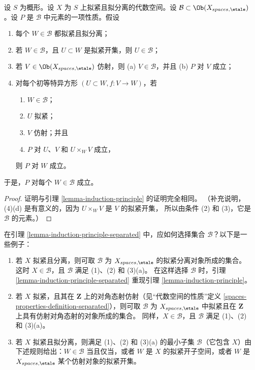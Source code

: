 \begin{lemma}
\label{lemma-induction-principle-separated}
设 $S$ 为概形。设 $X$ 为 $S$ 上拟紧且拟分离的代数空间。设
$\mathcal{B} \subset \Ob(X_{spaces, \etale})$。设 $P$ 是
$\mathcal{B}$ 中元素的一项性质。假设
\begin{enumerate}
\item 每个 $W \in \mathcal{B}$ 都拟紧且拟分离；
\item 若 $W \in \mathcal{B}$，且 $U \subset W$ 是拟紧开集，则
$U \in \mathcal{B}$；
\item 若 $V \in \Ob(X_{spaces, \etale})$ 仿射，则
(a) $V \in \mathcal{B}$，并且 (b) $P$ 对 $V$ 成立；
\item 对每个初等特异方形 $(U \subset W, f : V \to W)$，若
\begin{enumerate}
\item $W \in \mathcal{B}$；
\item $U$ 拟紧；
\item $V$ 仿射；并且
\item $P$ 对 $U$、$V$ 和 $U \times_W V$ 成立，
\end{enumerate}
则 $P$ 对 $W$ 成立。
\end{enumerate}
于是，$P$ 对每个 $W \in \mathcal{B}$ 成立。
\end{lemma}

\begin{proof}
证明与引理 \ref{lemma-induction-principle} 的证明完全相同。
（补充说明，(4)(d) 是有意义的，因为 $U \times_W V$ 是 $V$ 的拟紧开集，
所以由条件 (2) 和 (3)，它是 $\mathcal{B}$ 的元素。）
\end{proof}

\begin{remark}
\label{remark-how-to}
在引理 \ref{lemma-induction-principle-separated} 中，应如何选择集合
$\mathcal{B}$？以下是一些例子：
\begin{enumerate}
\item 若 $X$ 拟紧且分离，则可取 $\mathcal{B}$ 为
$X_{spaces, \etale}$ 的拟紧分离对象所成的集合。这时
$X \in \mathcal{B}$，且 $\mathcal{B}$ 满足 (1)、(2) 和 (3)(a)。
在这样选择 $\mathcal{B}$ 时，引理
\ref{lemma-induction-principle-separated} 重现引理
\ref{lemma-induction-principle}。
\item 若 $X$ 拟紧，且其在 $\mathbf{Z}$ 上的对角态射仿射（见“代数空间的性质”定义
\ref{spaces-properties-definition-separated}），则可取 $\mathcal{B}$ 为
$X_{spaces, \etale}$ 中拟紧且在 $\mathbf{Z}$ 上具有仿射对角态射的对象所成的集合。
同样，$X \in \mathcal{B}$，且 $\mathcal{B}$ 满足 (1)、(2) 和 (3)(a)。
\item 若 $X$ 拟紧且拟分离，则满足 (1)、(2) 和 (3)(a) 的最小子集
$\mathcal{B}$（它包含 $X$）由下述规则给出：$W \in \mathcal{B}$ 当且仅当，或者
$W$ 是 $X$ 的拟紧开子空间，或者 $W$ 是 $X_{spaces, \etale}$
某个仿射对象的拟紧开集。
\end{enumerate}
\end{remark}

